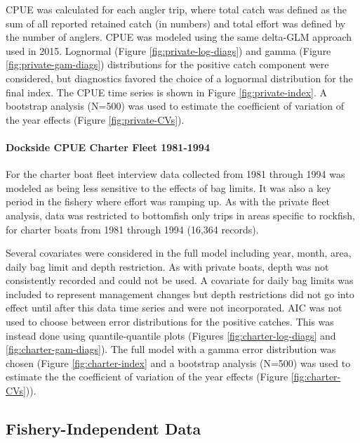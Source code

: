\documentclass[11pt,
  english,
  letterpaper,
]{article}
\begin{document}
CPUE was calculated for each angler trip, where total catch was defined as the sum of all reported retained catch (in numbers) and total effort was defined by the number of anglers. CPUE was modeled using the same delta-GLM approach used in 2015. Lognormal (Figure \ref{fig:private-log-diags}) and gamma (Figure \ref{fig:private-gam-diags}) distributions for the positive catch component were considered, but diagnostics favored the choice of a lognormal distribution for the final index. The CPUE time series is shown in Figure \ref{fig:private-index}. A bootstrap analysis (N=500) was used to estimate the coefficient of variation of the year effects (Figure \ref{fig:private-CVs}).

\hypertarget{dockside-cpue-charter-fleet-1981-1994}{%
\paragraph{Dockside CPUE Charter Fleet 1981-1994}\label{dockside-cpue-charter-fleet-1981-1994}}

For the charter boat fleet interview data collected from 1981 through 1994 was modeled as being less sensitive to the effects of bag limits. It was also a key period in the fishery where effort was ramping up. As with the private fleet analysis, data was restricted to bottomfish only trips in areas specific to rockfish, for charter boats from 1981 through 1994 (16,364 records).

Several covariates were considered in the full model including year, month, area, daily bag limit and depth restriction. As with private boats, depth was not consistently recorded and could not be used. A covariate for daily bag limits was included to represent management changes but depth restrictions did not go into effect until after this data time series and were not incorporated. AIC was not used to choose between error distributions for the positive catches. This was instead done using quantile-quantile plots (Figures \ref{fig:charter-log-diags} and \ref{fig:charter-gam-diags}). The full model with a gamma error distribution was chosen (Figure \ref{fig:charter-index} and a bootstrap analysis (N=500) was used to estimate the the coefficient of variation of the year effects (Figure \ref{fig:charter-CVs})).

\hypertarget{fishery-independent-data}{%
\subsection{Fishery-Independent Data}\label{fishery-independent-data}}
\end{document}
